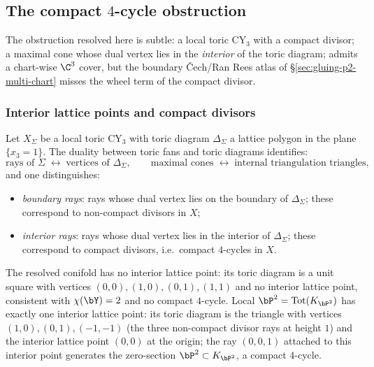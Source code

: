 \subsection{The compact $4$-cycle obstruction}
\label{sec:gluing-p2-compact-cycle}

The obstruction resolved here is subtle: a local toric CY$_3$ with a
compact divisor; a maximal cone whose dual vertex lies in the
\emph{interior} of the toric diagram; admits a chart-wise $\C^3$ cover,
but the boundary \v{C}ech/Ran Rees atlas of
\S\ref{sec:gluing-p2-multi-chart} misses the wheel term of the compact
divisor.

\subsubsection{Interior lattice points and compact divisors}

Let $X_\Sigma$ be a local toric CY$_3$ with toric diagram $\Delta_\Sigma$ a
lattice polygon in the plane $\{x_3 = 1\}$. The duality between toric
fans and toric diagrams identifies:
\[
 \text{rays of } \Sigma \;\longleftrightarrow\; \text{vertices of } \Delta_\Sigma,
 \qquad
 \text{maximal cones} \;\longleftrightarrow\; \text{internal triangulation triangles},
\]
and one distinguishes:
\begin{itemize}
\item \emph{boundary rays}: rays whose dual vertex lies on the boundary of
 $\Delta_\Sigma$; these correspond to non-compact divisors in $X$;
\item \emph{interior rays}: rays whose dual vertex lies in the interior
 of $\Delta_\Sigma$; these correspond to compact divisors, i.e.\ compact
 $4$-cycles in $X$.
\end{itemize}
The resolved conifold has no interior lattice point: its toric diagram is a
unit square with vertices $(0,0), (1,0), (0,1), (1,1)$ and no interior
lattice point, consistent with $\chi(\bY) = 2$ and no compact $4$-cycle.
Local $\bP^2 = \mathrm{Tot}(K_{\bP^2})$ has exactly one interior lattice
point: its toric diagram is the triangle with vertices $(1,0), (0,1),
(-1,-1)$ (the three non-compact divisor rays at height $1$) and the
interior lattice point $(0,0)$ at the origin; the ray $(0,0,1)$ attached
to this interior point generates the zero-section $\bP^2 \subset K_{\bP^2}$,
a compact $4$-cycle.

